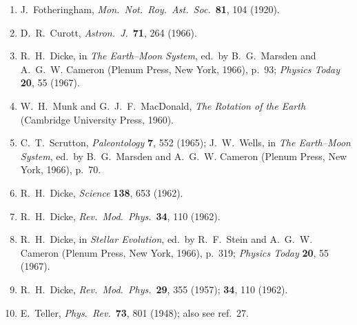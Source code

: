 \begin{enumerate}
  \item{}\label{ch16-ref-33}
  J.~Fotheringham, \emph{Mon.\ Not.\ Roy.\ Ast.\ Soc.}\ \textbf{81},
  104 (1920).

  \item{}\label{ch16-ref-34}
  D.~R.~Curott, \emph{Astron.\ J.}\ \textbf{71}, 264 (1966).

  \item{}\label{ch16-ref-35}
  R.~H.~Dicke, in \emph{The Earth--Moon System}, ed.\ by
  B.~G.~Marsden and A.~G.~W. Cameron
  (Plenum Press, New York, 1966), p.~93;
  \emph{Physics Today} \textbf{20}, 55 (1967).

  \item{}\label{ch16-ref-36}
  W.~H.~Munk and G.~J.~F.~MacDonald,
  \emph{The Rotation of the Earth}
  (Cambridge University Press, 1960).

  \item{}\label{ch16-ref-37}
  C.~T.~Scrutton, \emph{Paleontology} \textbf{7}, 552 (1965);
  J.~W.~Wells, in \emph{The Earth--Moon System}, ed.\ by
  B.~G.~Marsden and A.~G.~W. Cameron
  (Plenum Press, New York, 1966), p.~70.

  \item{}\label{ch16-ref-38}
  R.~H.~Dicke, \emph{Science} \textbf{138}, 653 (1962).

  \item{}\label{ch16-ref-39}
  R.~H.~Dicke, \emph{Rev.\ Mod.\ Phys.}\ \textbf{34}, 110 (1962).

  \item{}\label{ch16-ref-40}
  R.~H.~Dicke, in \emph{Stellar Evolution}, ed.\ by R.~F.~Stein and
  A.~G.~W. Cameron (Plenum Press, New York, 1966), p.~319;
  \emph{Physics Today} \textbf{20}, 55 (1967).

  \item{}\label{ch16-ref-41}
  R.~H.~Dicke, \emph{Rev.\ Mod.\ Phys.}\ \textbf{29}, 355 (1957);
  \textbf{34}, 110 (1962).

  \item{}\label{ch16-ref-42}
  E.~Teller, \emph{Phys.\ Rev.}\ \textbf{73}, 801 (1948);
  also see ref.~27.
\end{enumerate}
